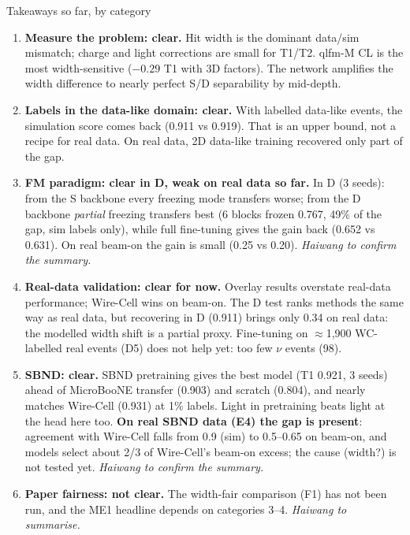 \documentclass[aspectratio=169,10pt]{beamer}
\begin{document}
\begin{frame}{Takeaways so far, by category}
  \scriptsize
  \begin{enumerate}\setlength{\itemsep}{3pt}
    \item \textbf{Measure the problem: clear.} Hit width is the dominant data/sim mismatch; charge and light corrections are small for T1/T2. qlfm-M CL is the most width-sensitive ($-0.29$ T1 with 3D factors). The network amplifies the width difference to nearly perfect S/D separability by mid-depth.
    \item \textbf{Labels in the data-like domain: clear.} With labelled data-like events, the simulation score comes back (0.911 vs 0.919). That is an upper bound, not a recipe for real data. On real data, 2D data-like training recovered only part of the gap.
    \item \textbf{FM paradigm: clear in D, weak on real data so far.} In D (3 seeds): from the S backbone every freezing mode transfers worse; from the D backbone \emph{partial} freezing transfers best (6 blocks frozen 0.767, 49\% of the gap, sim labels only), while full fine-tuning gives the gain back (0.652 vs 0.631). On real beam-on the gain is small (0.25 vs 0.20). \textit{Haiwang to confirm the summary.}
    \item \textbf{Real-data validation: clear for now.} Overlay results overstate real-data performance; Wire-Cell wins on beam-on. The D test ranks methods the same way as real data, but recovering in D (0.911) brings only 0.34 on real data: the modelled width shift is a partial proxy. Fine-tuning on $\approx$1,900 WC-labelled real events (D5) does not help yet: too few $\nu$ events (98).
    \item \textbf{SBND: clear.} SBND pretraining gives the best model (T1 0.921, 3 seeds) ahead of MicroBooNE transfer (0.903) and scratch (0.804), and nearly matches Wire-Cell (0.931) at 1\% labels. Light in pretraining beats light at the head here too. \textbf{On real SBND data (E4) the gap is present}: agreement with Wire-Cell falls from 0.9 (sim) to 0.5--0.65 on beam-on, and models select about 2/3 of Wire-Cell's beam-on excess; the cause (width?) is not tested yet. \textit{Haiwang to confirm the summary.}
    \item \textbf{Paper fairness: not clear.} The width-fair comparison (F1) has not been run, and the ME1 headline depends on categories 3--4. \textit{Haiwang to summarise.}
  \end{enumerate}
\end{frame}
\end{document}
